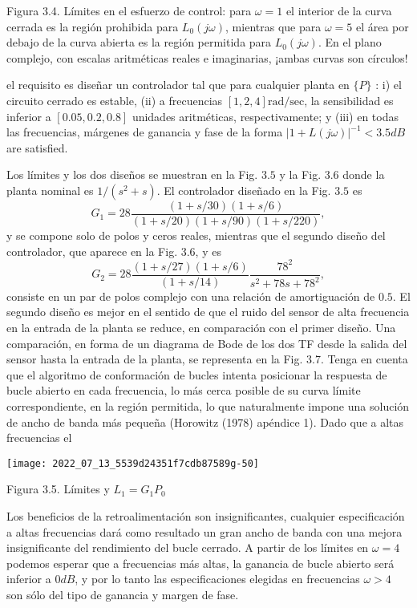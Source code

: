 Figura 3.4. Límites en el esfuerzo de control: para $\omega=1$ el interior de la curva cerrada es la región prohibida para $L_{0}(j \omega)$, mientras que para $\omega=5$ el área por debajo de la curva abierta es la región permitida para $L_{0}(j \omega)$. En el plano complejo, con escalas aritméticas reales e imaginarias, ¡ambas curvas son círculos!

el requisito es diseñar un controlador tal que para cualquier planta en $\{P\}$ : i) el circuito cerrado es estable, (ii) a frecuencias $[1,2,4] \mathrm{rad} / \mathrm{sec}$, la sensibilidad es inferior a $[0.05,0.2,0.8]$ unidades aritméticas, respectivamente; y (iii) en todas las frecuencias, márgenes de ganancia y fase de la forma $|1+L(j \omega)|^{-1}<3.5 d B$ are satisfied.

Los límites y los dos diseños se muestran en la Fig. $3.5$ y la Fig. $3.6$ donde la planta nominal es $1 /\left(s^{2}+s\right)$. El controlador diseñado en la Fig. $3.5$ es
$$
G_{1}=28 \frac{(1+s / 30)(1+s / 6)}{(1+s / 20)(1+s / 90)(1+s / 220)},
$$
y se compone solo de polos y ceros reales, mientras que el segundo diseño del controlador, que aparece en la Fig. 3.6, y es
$$
G_{2}=28 \frac{(1+s / 27)(1+s / 6)}{(1+s / 14)} \frac{78^{2}}{s^{2}+78 s+78^{2}},
$$
consiste en un par de polos complejo con una relación de amortiguación de $ 0.5 $. El segundo diseño es mejor en el sentido de que el ruido del sensor de alta frecuencia en la entrada de la planta se reduce, en comparación con el primer diseño. Una comparación, en forma de un diagrama de Bode de los dos TF desde la salida del sensor hasta la entrada de la planta, se representa en la Fig. 3.7. Tenga en cuenta que el algoritmo de conformación de bucles intenta posicionar la respuesta de bucle abierto en cada frecuencia, lo más cerca posible de su curva límite correspondiente, en la región permitida, lo que naturalmente impone una solución de ancho de banda más pequeña (Horowitz (1978) apéndice 1). Dado que a altas frecuencias el

\texttt{[image: 2022\_07\_13\_5539d24351f7cdb87589g-50]}

Figura 3.5. Límites y $L_{1}=G_{1} P_{0}$

Los beneficios de la retroalimentación son insignificantes, cualquier especificación a altas frecuencias dará como resultado un gran ancho de banda con una mejora insignificante del rendimiento del bucle cerrado. A partir de los límites en $\omega=4$ podemos esperar que a frecuencias más altas, la ganancia de bucle abierto será inferior a $0 d B$, y por lo tanto las especificaciones elegidas en frecuencias $\omega>4$ son sólo del tipo de ganancia y margen de fase.

